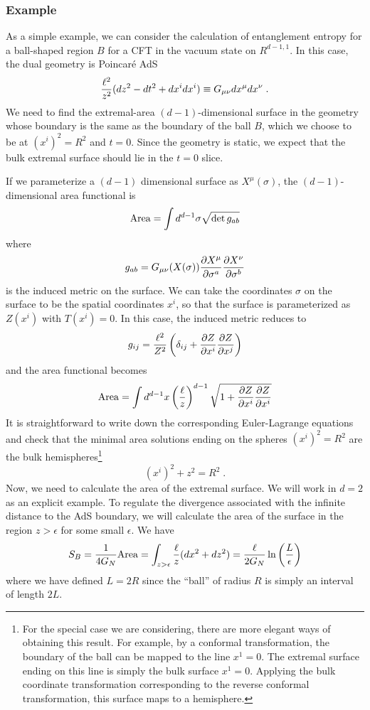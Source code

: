 \documentclass[12pt,epsf]{article}
\newcommand{\be}{\begin{equation}}
\newcommand{\ee}{\end{equation}}
\begin{document}
\subsubsection*{Example}

As a simple example, we can consider the calculation of entanglement entropy for a ball-shaped region $B$ for a CFT in the vacuum state on $R^{d-1,1}$. In this case, the dual geometry is Poincar\'e AdS
\be
{\ell^2 \over z^2} (dz^2 -dt^2 + dx^i dx^i) \equiv G_{\mu \nu} dx^\mu dx^\nu \; .
\ee
We need to find the extremal-area $(d-1)$-dimensional surface in the geometry whose boundary is the same as the boundary of the ball $B$, which we choose to be at $(x^i)^2 = R^2$ and $t=0$. Since the geometry is static, we expect that the bulk extremal surface should lie in the $t=0$ slice.

If we parameterize a $(d-1)$ dimensional surface as $X^\mu(\sigma)$, the $(d-1)$-dimensional area functional is
\be
\label{Area_explicit}
{\rm Area} = \int d^{d-1} \sigma \sqrt{\det g_{ab}}
\ee
where
\be
\label{Induced}
g_{ab} = G_{\mu \nu}(X(\sigma)) {\partial X^\mu \over \partial \sigma^a} {\partial X^\nu \over \partial \sigma^b}
\ee
is the induced metric on the surface. We can take the coordinates $\sigma$ on the surface to be the spatial coordinates $x^i$, so that the surface is parameterized as $Z(x^i)$ with  $T(x^i)=0$. In this case, the induced metric reduces to
\be
g_{ij} = {\ell^2 \over Z^2} \left(\delta_{ij} + {\partial Z \over \partial x^i} {\partial Z \over \partial x^j}\right)
\ee
and the area functional becomes
\be
{\rm Area} = \int d^{d-1} x \left( {\ell \over z} \right)^{d-1} \sqrt{1 + {\partial Z \over \partial x^i} {\partial Z \over \partial x^i}}
\ee
It is straightforward to write down the corresponding Euler-Lagrange equations and check that the minimal area solutions ending on the spheres $(x^i)^2 = R^2$ are the bulk hemispheres\footnote{For the special case we are considering, there are more elegant ways of obtaining this result. For example, by a conformal transformation, the boundary of the ball can be mapped to the line $x^1=0$. The extremal surface ending on this line is simply the bulk surface $x^1 = 0$. Applying the bulk coordinate transformation corresponding to the reverse conformal transformation, this surface maps to a hemisphere.}
\be
(x^i)^2 + z^2 = R^2 \; .
\ee
Now, we need to calculate the area of the extremal surface. We will work in $d=2$ as an explicit example. To regulate the divergence associated with the infinite distance to the AdS boundary, we will calculate the area of the surface in the region $z > \epsilon$ for some small $\epsilon$. We have
\be
\label{gravS}
S_B = {1 \over 4 G_N} {\rm Area} = \int_{z>\epsilon}  {\ell \over z}  (dx^2 + dz^2) = {\ell \over 2 G_N} \ln \left({L \over \epsilon}\right)
\ee
where we have defined $L = 2R$ since the ``ball'' of radius $R$ is simply an interval of length $2L$.
\end{document}
